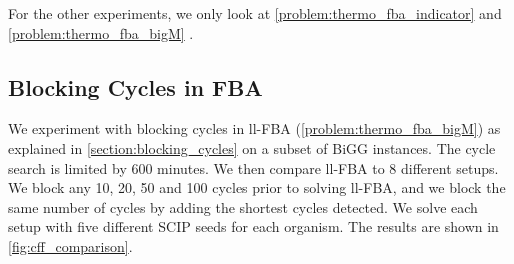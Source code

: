 For the other experiments, we only look at \cref{problem:thermo_fba_indicator} and \cref{problem:thermo_fba_bigM} .


\subsection{Blocking Cycles in FBA}
We experiment with blocking cycles in ll-FBA (\cref{problem:thermo_fba_bigM}) as explained in \cref{section:blocking_cycles} on a subset of BiGG instances. 
The cycle search is limited by 600 minutes. 
We then compare ll-FBA to 8 different setups. We block any 10, 20, 50 and 100 cycles prior to solving ll-FBA, and we block the same number of cycles by adding the shortest cycles detected. 
We solve each setup with five different \textsf{SCIP} seeds for each organism. The results are shown in \cref{fig:cff_comparison}.

